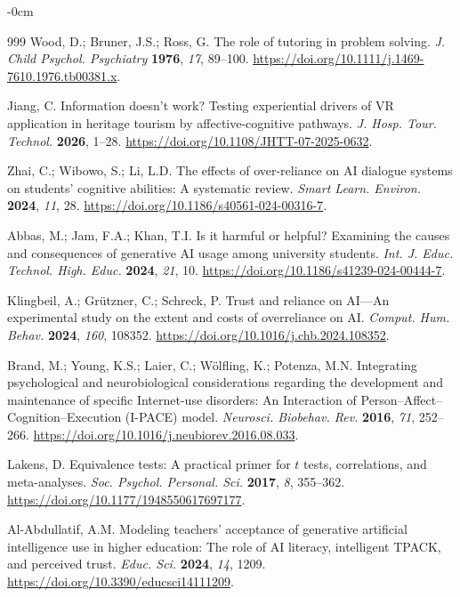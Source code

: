 \documentclass[sustainability,article,accept,moreauthors]{Definitions/mdpi}
\begin{document}
\begin{adjustwidth}{-\extralength}{0cm}
\begin{thebibliography}{999}
Wood, D.; Bruner, J.S.; Ross, G. The role of tutoring in problem solving. \textit{J. Child Psychol. Psychiatry} \textbf{1976}, \textit{17}, 89--100. \url{https://doi.org/10.1111/j.1469-7610.1976.tb00381.x}.


Jiang, C. Information doesn't work? Testing experiential drivers of VR application in heritage tourism by affective-cognitive pathways. \textit{J. Hosp. Tour. Technol.} \textbf{2026}, 1--28. \url{https://doi.org/10.1108/JHTT-07-2025-0632}.

Zhai, C.; Wibowo, S.; Li, L.D. The effects of over-reliance on AI dialogue systems on students' cognitive abilities: A systematic review. \textit{Smart Learn. Environ.} \textbf{2024}, \textit{11}, 28. \url{https://doi.org/10.1186/s40561-024-00316-7}.

Abbas, M.; Jam, F.A.; Khan, T.I. Is it harmful or helpful? Examining the causes and consequences of generative AI usage among university students. \textit{Int. J. Educ. Technol. High. Educ.} \textbf{2024}, \textit{21}, 10. \url{https://doi.org/10.1186/s41239-024-00444-7}.

Klingbeil, A.; Gr{\"u}tzner, C.; Schreck, P. Trust and reliance on AI---An experimental study on the extent and costs of overreliance on AI. \textit{Comput. Hum. Behav.} \textbf{2024}, \textit{160}, 108352. \url{https://doi.org/10.1016/j.chb.2024.108352}.

Brand, M.; Young, K.S.; Laier, C.; W{\"o}lfling, K.; Potenza, M.N. Integrating psychological and neurobiological considerations regarding the development and maintenance of specific Internet-use disorders: An Interaction of Person--Affect--Cognition--Execution (I-PACE) model. \textit{Neurosci. Biobehav. Rev.} \textbf{2016}, \textit{71}, 252--266. \url{https://doi.org/10.1016/j.neubiorev.2016.08.033}.

Lakens, D. Equivalence tests: A practical primer for $t$ tests, correlations, and meta-analyses. \textit{Soc. Psychol. Personal. Sci.} \textbf{2017}, \textit{8}, 355--362. \url{https://doi.org/10.1177/1948550617697177}.

Al-Abdullatif, A.M. Modeling teachers' acceptance of generative artificial intelligence use in higher education: The role of AI literacy, intelligent TPACK, and perceived trust. \textit{Educ. Sci.} \textbf{2024}, \textit{14}, 1209. \url{https://doi.org/10.3390/educsci14111209}.


\end{thebibliography}
\end{adjustwidth}
\end{document}
